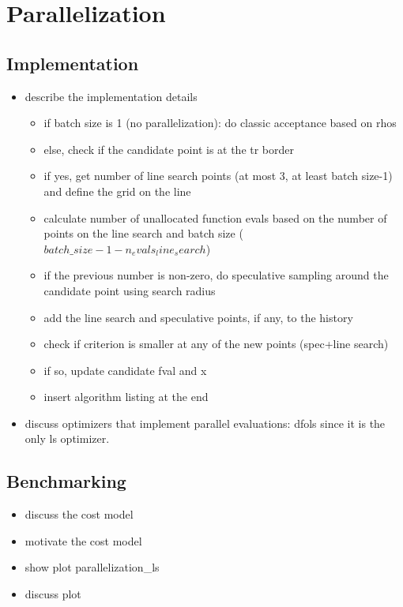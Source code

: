 

\section{Parallelization}
\subsection{Implementation}
\begin{itemize}
\item describe the implementation details
\begin{itemize}
    \item if batch size is 1 (no parallelization): do classic acceptance based on rhos
    \item else, check if the candidate point is at the tr border
    \item if yes, get number of line search points (at most 3, at least batch size-1) and define the grid on the line
    \item calculate number of unallocated function evals based on the number of points on the line search and batch size ($batch\_size-1-n_evals_line_search$) 
    \item if the previous number is non-zero, do speculative sampling around the candidate point using search radius
    \item add the line search and speculative points, if any, to the history
    \item check if criterion is smaller at any of the new points (spec+line search)
    \item if so, update candidate fval and x
    \item insert algorithm listing at the end
\end{itemize}
\item discuss optimizers that implement parallel evaluations: dfols since it is the only ls optimizer.
\end{itemize}

\subsection{Benchmarking}
\begin{itemize}
    \item discuss the cost model
    \item motivate the cost model
    \item show plot parallelization\_ls
    \item discuss plot
\end{itemize}
